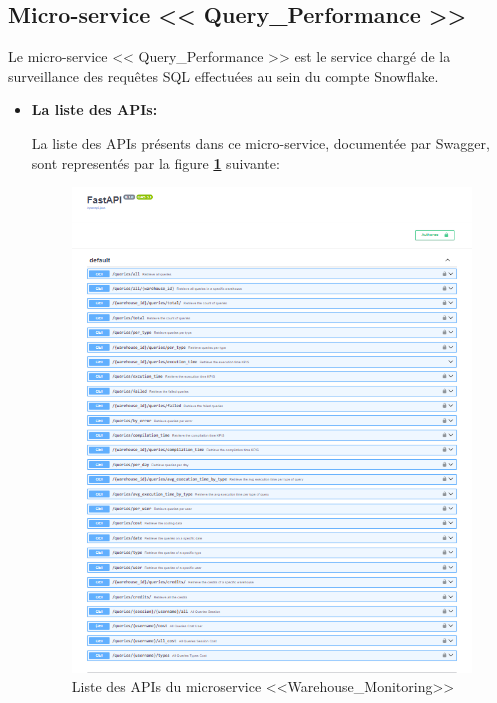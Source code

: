 \subsection{Micro-service << Query\_Performance >>}
\par Le micro-service << Query\_Performance  >> est le service chargé de la surveillance des requêtes SQL effectuées au sein du compte Snowflake.
\begin{itemize}
    \item \textbf{La liste des APIs:}
        \par La liste des APIs présents dans ce micro-service, documentée par Swagger, sont representés par la figure \textbf{\ref{fig:apiquery}} suivante:
        \begin{figure}[H]
            \centering
            \includegraphics[width =1\linewidth]{img/captures/queries_apis.PNG}
            \caption{Liste des APIs du microservice <<Warehouse\_Monitoring>> }
                \label{fig:apiquery}
        \end{figure}


\end{itemize}
